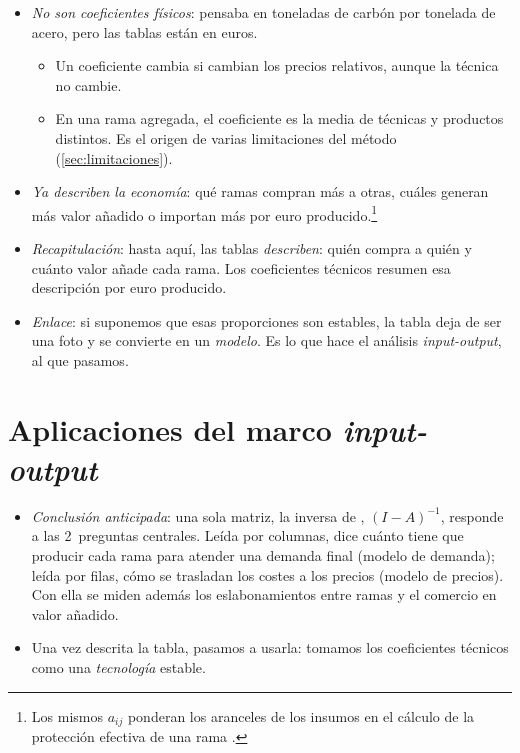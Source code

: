 \documentclass[11pt]{article}
\begin{document}
\begin{itemize}
\begin{itemize}
  \end{itemize}
\item \emph{No son coeficientes físicos}:  pensaba en toneladas de carbón por tonelada de acero, pero las tablas están en euros.
  \begin{itemize}
  \item Un coeficiente cambia si cambian los precios relativos, aunque la técnica no cambie.
  \item En una rama agregada, el coeficiente es la media de técnicas y productos distintos. Es el origen de varias limitaciones del método (\ref{sec:limitaciones}).
  \end{itemize}
\item \emph{Ya describen la economía}: qué ramas compran más a otras, cuáles generan más valor añadido o importan más por euro producido.\footnote{Los mismos $a_{ij}$ ponderan los aranceles de los insumos en el cálculo de la protección efectiva de una rama .}
\end{itemize}

\begin{itemize}
\item \emph{Recapitulación}: hasta aquí, las tablas \emph{describen}: quién compra a quién y cuánto valor añade cada rama. Los coeficientes técnicos resumen esa descripción por euro producido.
\item \emph{Enlace}: si suponemos que esas proporciones son estables, la tabla deja de ser una foto y se convierte en un \emph{modelo}. Es lo que hace el análisis \emph{input-output}, al que pasamos.
\end{itemize}


\section{Aplicaciones del marco \emph{input-output}}\label{sec:aplicaciones}

\begin{itemize}
\item \emph{Conclusión anticipada}: una sola matriz, la inversa de , $(I-A)^{-1}$, responde a las 2~preguntas centrales. Leída por columnas, dice cuánto tiene que producir cada rama para atender una demanda final (modelo de demanda); leída por filas, cómo se trasladan los costes a los precios (modelo de precios). Con ella se miden además los eslabonamientos entre ramas y el comercio en valor añadido.
\item Una vez descrita la tabla, pasamos a usarla: tomamos los coeficientes técnicos como una \emph{tecnología} estable.
\end{itemize}
\end{document}
